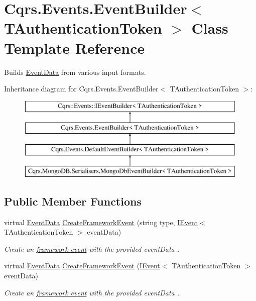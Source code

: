 \hypertarget{classCqrs_1_1Events_1_1EventBuilder}{}\section{Cqrs.\+Events.\+Event\+Builder$<$ T\+Authentication\+Token $>$ Class Template Reference}
\label{classCqrs_1_1Events_1_1EventBuilder}


Builds \hyperlink{classCqrs_1_1Events_1_1EventData}{Event\+Data} from various input formats.  


Inheritance diagram for Cqrs.\+Events.\+Event\+Builder$<$ T\+Authentication\+Token $>$\+:\begin{figure}[H]
\begin{center}
\leavevmode
\includegraphics[height=4.000000cm]{classCqrs_1_1Events_1_1EventBuilder}
\end{center}
\end{figure}
\subsection*{Public Member Functions}
\begin{DoxyCompactItemize}
\item 
virtual \hyperlink{classCqrs_1_1Events_1_1EventData}{Event\+Data} \hyperlink{classCqrs_1_1Events_1_1EventBuilder_aa6a794ef27f2795802a4390fd16535f6_aa6a794ef27f2795802a4390fd16535f6}{Create\+Framework\+Event} (string type, \hyperlink{interfaceCqrs_1_1Events_1_1IEvent}{I\+Event}$<$ T\+Authentication\+Token $>$ event\+Data)
\begin{DoxyCompactList}\small\item\em Create an \hyperlink{}{framework event} with the provided {\itshape event\+Data} . \end{DoxyCompactList}\item 
virtual \hyperlink{classCqrs_1_1Events_1_1EventData}{Event\+Data} \hyperlink{classCqrs_1_1Events_1_1EventBuilder_abcc2515f98e4852ab656f1868e7a344c_abcc2515f98e4852ab656f1868e7a344c}{Create\+Framework\+Event} (\hyperlink{interfaceCqrs_1_1Events_1_1IEvent}{I\+Event}$<$ T\+Authentication\+Token $>$ event\+Data)
\begin{DoxyCompactList}\small\item\em Create an \hyperlink{}{framework event} with the provided {\itshape event\+Data} . \end{DoxyCompactList}\end{DoxyCompactItemize}
